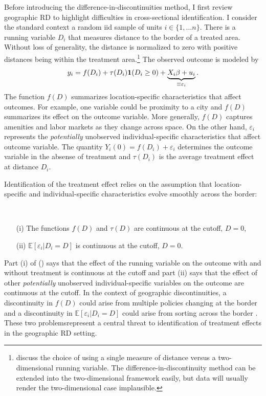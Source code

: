 \documentclass[12pt]{article}
\begin{document}
Before introducing the difference-in-discontinuities method, I first review geographic RD to highlight difficulties in cross-sectional identification. I consider the standard context a random iid sample of units $i \in \{1, \dots n\}$. There is a running variable $D_i$ that measures distance to the border of a treated area. Without loss of generality, the distance is normalized to zero with positive distances being within the treatment area.\footnote{\citet{Keele_Titiunik_2015} discuss the choice of using a single measure of distance versus a two-dimensional running variable. The difference-in-discontinuity method can be extended into the two-dimensional framework easily, but data will usually render the two-dimensional case implausible.} The observed outcome is modeled by 
$$
    y_i = f(D_i) + \tau(D_i) \mathbf{1}(D_i \geq 0) + \underbrace{X_i \beta + u_i}_{\equiv \varepsilon_i}. 
$$
The function $f(D)$ summarizes location-specific characteristics that affect outcomes. For example, one variable could be proximity to a city and $f(D)$ summarizes its effect on the outcome variable. More generally, $f(D)$ captures amenities and labor markets as they change across space. On the other hand, $\varepsilon_i$ represents the \emph{potentially} unobserved individual-specific characteristics that affect outcome variable. The quantity $Y_i(0) = f(D_i) + \varepsilon_i$ determines the outcome variable in the absense of treatment and $\tau(D_i)$ is the average treatment effect at distance $D_i$. 

Identification of the treatment effect relies on the assumption that location-specific and individual-specific characteristics evolve smoothly across the border:

\begin{assumption}[RD]\label{eq:continuity}\ \\\vspace{-10mm} 
    \begin{itemize}
        \item[(i)] The functions $f(D)$ and $\tau(D)$ are continuous at the cutoff, $D = 0$,
        \item[(ii)] $\mathbb{E}\left[ \varepsilon_i \vert D_i = D \right]$ is continuous at the cutoff, $D = 0$. 
    \end{itemize}
\end{assumption}

Part (i) of () says that the effect of the running variable on the outcome with and without treatment is continuous at the cutoff and part (ii) says that the effect of other \emph{potentially} unobserved individual-specific variables on the outcome are continuous at the cutoff. In the context of geographic discontinuities, a discontinuity in $f(D)$ could arise from multiple policies changing at the border and a discontinuity in $\mathbb{E}\left[ \varepsilon_i \vert D_i = D \right]$ could arise from sorting across the border \citep{Keele_Titiunik_2015}. These two problemsrepresent a central threat to identification of treatment effects in the geographic RD setting. 
\end{document}
